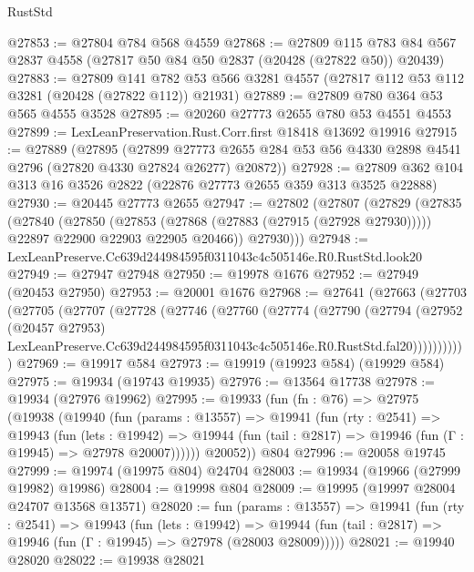 \begin{lexlean}{RustStd}
\begin{coremodule}
@27853 := @27804 @784 @568 @4559
@27868 := @27809
    @115
    @783
    @84
    @567
    @2837
    @4558
    (@27817 @50 @84 @50 @2837 (@20428 (@27822 @50)) @20439)
@27883 := @27809
    @141
    @782
    @53
    @566
    @3281
    @4557
    (@27817 @112 @53 @112 @3281 (@20428 (@27822 @112)) @21931)
@27889 := @27809 @780 @364 @53 @565 @4555 @3528
@27895 := @20260 @27773 @2655 @780 @53 @4551 @4553
@27899 := LexLeanPreservation.Rust.Corr.first @18418 @13692 @19916
@27915 := @27889
    (@27895
      (@27899
        @27773
        @2655
        @284
        @53
        @56
        @4330
        @2898
        @4541
        @2796
        (@27820 @4330 @27824 @26277)
        @20872))
@27928 := @27809 @362 @104 @313 @16 @3526 @2822 (@22876 @27773 @2655 @359 @313 @3525 @22888)
@27930 := @20445 @27773 @2655
@27947 := @27802
    (@27807
      (@27829
        (@27835
          (@27840
            (@27850
              (@27853 (@27868 (@27883 (@27915 (@27928 @27930)))))
              @22897
              @22900
              @22903
              @22905
              @20466))
          @27930)))
@27948 := LexLeanPreserve.Cc639d244984595f0311043c4c505146e.R0.RustStd.look20
@27949 := @27947 @27948
@27950 := @19978 @1676
@27952 := @27949 (@20453 @27950)
@27953 := @20001 @1676
@27968 := @27641
    (@27663
      (@27703
        (@27705
          (@27707
            (@27728
              (@27746
                (@27760
                  (@27774
                    (@27790
                      (@27794
                        (@27952
                          (@20457 @27953)
                          LexLeanPreserve.Cc639d244984595f0311043c4c505146e.R0.RustStd.fal20)))))))))))
@27969 := @19917 @584
@27973 := @19919 (@19923 @584) (@19929 @584)
@27975 := @19934 (@19743 @19935)
@27976 := @13564 @17738
@27978 := @19934 (@27976 @19962)
@27995 := @19933
    (fun (fn : @76) =>
    @27975
      (@19938
        (@19940
          (fun (params : @13557) =>
          @19941
            (fun (rty : @2541) =>
            @19943
              (fun (lets : @19942) =>
              @19944 (fun (tail : @2817) => @19946 (fun (Γ : @19945) => @27978 @20007))))))
        @20052))
    @804
@27996 := @20058 @19745
@27999 := @19974 (@19975 @804) @24704
@28003 := @19934 (@19966 (@27999 @19982) @19986)
@28004 := @19998 @804
@28009 := @19995 (@19997 @28004 @24707 @13568 @13571)
@28020 := fun (params : @13557) =>
  @19941
    (fun (rty : @2541) =>
    @19943
      (fun (lets : @19942) =>
      @19944 (fun (tail : @2817) => @19946 (fun (Γ : @19945) => @27978 (@28003 @28009)))))
@28021 := @19940 @28020
@28022 := @19938 @28021

\end{coremodule}
\end{lexlean}
